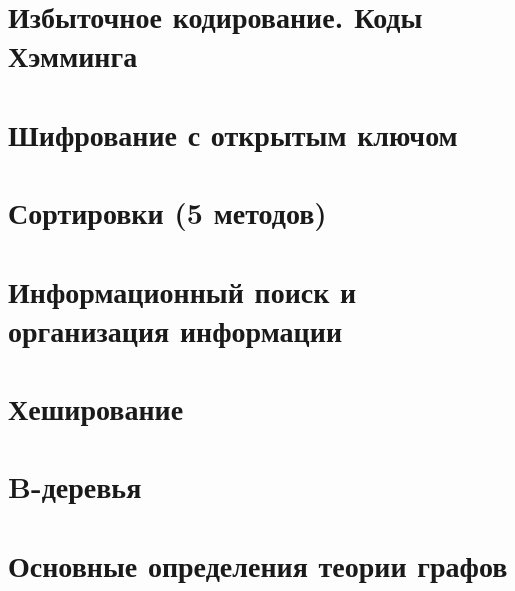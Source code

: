 \documentclass[12pt, fleqn]{article}
\begin{document}
  

  

  \section{Избыточное кодирование. Коды Хэмминга}
  \newpage

  \section{Шифрование с открытым ключом}
  \newpage

  \section{Сортировки (5 методов)}
  \newpage

  \section{Информационный поиск и организация информации}
  \newpage

  \section{Хеширование}
  \newpage

  

  \section{B-деревья}
  \newpage

  

  \section{Основные определения теории графов}
  \newpage
\end{document}
